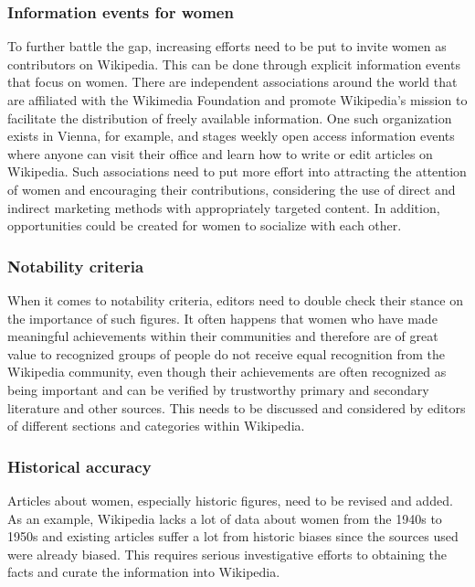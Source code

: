 \documentclass[a4paper, 11pt]{article}
\begin{document}
\subsubsection{Information events for women} \label{sec:gender-gap-wikipedia:infoevents}
To further battle the gap, increasing efforts need to be put to invite women as contributors on Wikipedia. This can be done through explicit information events that focus on women. There are independent associations around the world that are affiliated with the Wikimedia Foundation and promote Wikipedia's mission to facilitate the distribution of freely available information. One such organization exists in Vienna, for example, and stages weekly open access information events where anyone can visit their office and learn how to write or edit articles on Wikipedia. Such associations need to put more effort into attracting the attention of women and encouraging their contributions, considering the use of direct and indirect marketing methods with appropriately targeted content. In addition, opportunities could be created for women to socialize with each other.

\subsubsection{Notability criteria} \label{sec:gender-gap-wikipedia:fixnotability}
When it comes to notability criteria, editors need to double check their stance on the importance of such figures. It often happens that women who have made meaningful achievements within their communities and therefore are of great value to recognized groups of people do not receive equal recognition from the Wikipedia community, even though their achievements are often recognized as being important and can be verified by trustworthy primary and secondary literature and other sources. This needs to be discussed and considered by editors of different sections and categories within Wikipedia.

\subsubsection{Historical accuracy} \label{sec:gender-gap-wikipedia:historyaccuracy}
Articles about women, especially historic figures, need to be revised and added. As an example, Wikipedia lacks a lot of data about women from the 1940s to 1950s and existing articles suffer a lot from historic biases since the sources used were already biased. This requires serious investigative efforts to obtaining the facts and curate the information into Wikipedia.
\end{document}
